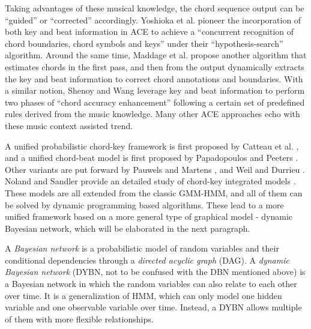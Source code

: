 Taking advantages of these musical knowledge, the chord sequence output can be ``guided'' or ``corrected'' accordingly. Yoshioka et al. \cite{yoshioka2004automatic} pioneer the incorporation of both key and beat information in ACE to achieve a ``concurrent recognition of chord boundaries, chord symbols and keys'' under their ``hypothesis-search'' algorithm. Around the same time, Maddage et al. \cite{maddage2004content} propose another algorithm that estimates chords in the first pass, and then from the output dynamically extracts the key and beat information to correct chord annotations and boundaries. With a similar notion, Shenoy and Wang \cite{shenoy2005key} leverage key and beat information to perform two phases of ``chord accuracy enhancement'' following a certain set of predefined rules derived from the music knowledge. Many other ACE approaches \cite{lee2008acoustic,zenz2007automatic,sumi2008automatic,reinhard2008enhancing,khadkevich2011time} echo with these music context assisted trend.

A unified probabilistic chord-key framework is first proposed by Catteau et al. \cite{catteau2007probabilistic}, and a unified chord-beat model is first proposed by Papadopoulos and Peeters \cite{papadopoulos2008simultaneous}. Other variants are put forward by Pauwels and Martens \cite{pauwels2010integrating,pauwels2014combining}, and Weil and Durrieu \cite{weil2009automatic}. Noland and Sandler provide an detailed study of chord-key integrated models \cite{noland2009influences}. These models are all extended from the classic GMM-HMM, and all of them can be solved by dynamic programming based algorithms. These lead to a more unified framework based on a more general type of graphical model - dynamic Bayesian network, which will be elaborated in the next paragraph.

A {\it Bayesian network} \cite{pearl2014probabilistic} is a probabilistic model of random variables and their conditional dependencies through a {\it directed acyclic graph} (DAG). A {\it dynamic Bayesian network} \cite{murphy2002dynamic} (DYBN, not to be confused with the DBN mentioned above) is a Bayesian network in which the random variables can also relate to each other over time. It is a generalization of HMM, which can only model one hidden variable and one observable variable over time. Instead, a DYBN allows multiple of them with more flexible relationships.

